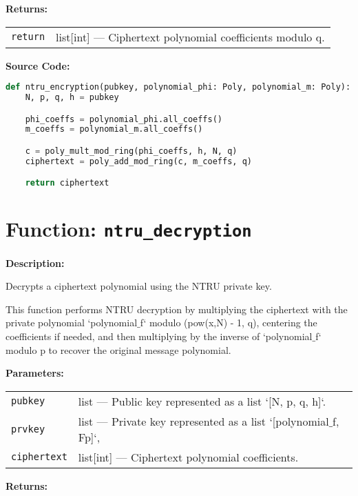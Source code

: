 \documentclass[a4paper,12pt]{article}
\begin{document}
\vspace{1em}
\noindent
\textbf{Returns:}

\begin{tabular}{p{3cm} p{11cm}}
\texttt{return} & list[int] — Ciphertext polynomial coefficients modulo q. \\
\end{tabular}

\vspace{1em}
\textbf{Source Code:}

\begin{lstlisting}[language=Python]
def ntru_encryption(pubkey, polynomial_phi: Poly, polynomial_m: Poly):
    N, p, q, h = pubkey

    phi_coeffs = polynomial_phi.all_coeffs()
    m_coeffs = polynomial_m.all_coeffs()

    c = poly_mult_mod_ring(phi_coeffs, h, N, q)
    ciphertext = poly_add_mod_ring(c, m_coeffs, q)

    return ciphertext
\end{lstlisting}

\section*{Function: \texttt{ntru\_decryption}}

\textbf{Description:}

Decrypts a ciphertext polynomial using the NTRU private key.

This function performs NTRU decryption by multiplying the ciphertext with the private
polynomial `polynomial$\_$f` modulo (pow(x,N) - 1, q), centering the coefficients if needed,
and then multiplying by the inverse of `polynomial$\_$f` modulo p to recover the original message polynomial.

\vspace{1em}
\textbf{Parameters:}

\vspace{1em}
\noindent
\begin{tabular}{p{3cm} p{11cm}}
\texttt{pubkey} & list — Public key represented as a list `[N, p, q, h]`. \\
\texttt{prvkey} & list — Private key represented as a list `[polynomial$\_$f, Fp]`, \\
\texttt{ciphertext} & list[int] — Ciphertext polynomial coefficients. \\
\end{tabular}

\vspace{1em}
\noindent
\textbf{Returns:}
\end{document}
